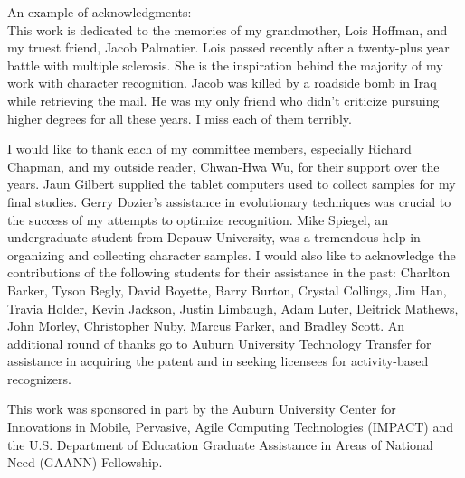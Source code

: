 \begin{acknowledgments}
An example of acknowledgments:\\
This work is dedicated to the memories of my grandmother, Lois Hoffman, and my 
truest friend, Jacob Palmatier.  Lois passed recently after a twenty-plus year battle
with multiple sclerosis.  She is the inspiration behind the majority of my work with 
character recognition.  Jacob was killed by a roadside bomb in Iraq while retrieving the mail.  He
was my only friend who didn't criticize pursuing higher degrees for all these years.
I miss each of them terribly.

I would like to thank each of my committee members, especially Richard Chapman,
and my outside reader, Chwan-Hwa Wu, for their support over the years.  
Jaun Gilbert supplied the tablet computers
used to collect samples for my final studies.  Gerry Dozier's assistance in evolutionary
techniques was crucial to the success of my attempts to optimize recognition.  Mike Spiegel,
an undergraduate student from Depauw University, was a tremendous help in organizing and collecting 
character samples.
I would also like to acknowledge the contributions of the following students for their assistance in the past:
Charlton Barker,
Tyson Begly,
David Boyette,
Barry Burton,
Crystal Collings,
Jim Han,
Travia Holder,
Kevin Jackson,
Justin Limbaugh,
Adam Luter,
Deitrick Mathews,
John Morley,
Christopher Nuby,
Marcus Parker,
and Bradley Scott.
An additional round of thanks go to
Auburn University Technology Transfer for assistance in acquiring the patent 
and in seeking licensees for activity-based recognizers.

This work was sponsored in part by the Auburn University Center for
Innovations in Mobile, Pervasive, Agile Computing Technologies
(IMPACT) and the U.S. Department of Education 
Graduate Assistance in Areas of National Need (GAANN) Fellowship. 

\end{acknowledgments}
